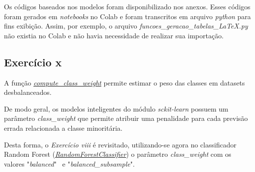 Os códigos baseados nos modelos foram disponibilizado nos anexos. Esses códigos foram gerados em \textit{notebooks} no Colab e foram transcritos em arquivo \textit{python} para fins exibição. Assim, por exemplo, o arquivo \textit{funcoes\_geracao\_tabelas\_LaTeX.py} não existia no Colab e não havia necessidade de realizar sua importação.

\subsection{Exercício x}

A função \href{https://scikit-learn.org/stable/modules/generated/sklearn.utils.class_weight.compute_class_weight.html}{\textit{compute\_class\_weight}} permite estimar o peso das classes em datasets desbalanceados.

De modo geral, os modelos inteligentes do módulo \textit{sckit-learn} possuem um parâmetro \textit{class\_weight} que permite atribuir uma penalidade para cada previsão errada relacionada a classe minoritária.

Desta forma, o \textit{Exercício viii} é revisitado, utilizando-se agora no  classificador Random Forest (\href{https://scikit-learn.org/stable/modules/generated/sklearn.ensemble.RandomForestClassifier.html}{\textit{RandomForestClassifier}}) o parâmetro \textit{class\_weight} com os valores "\textit{balanced}" \ e "\textit{balanced\_subsample}".